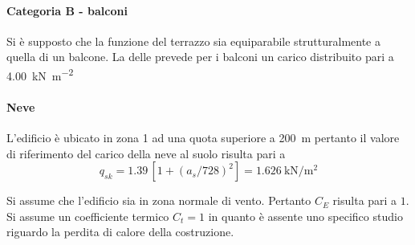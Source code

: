 \paragraph*{Categoria B - balconi} Si è supposto che la funzione del terrazzo sia equiparabile strutturalmente a quella di un balcone. 
La  delle  prevede per i balconi un carico distribuito pari a \SI{4.00}{\kilo\newton\per\square\meter}
\paragraph*{Neve}
L'edificio è ubicato in zona 1 ad una quota superiore a \SI{200}{\meter} pertanto il valore di riferimento del carico della neve al suolo risulta pari a
\[
	q_{sk}=1.39 \, [1+(a_s/728)^2] = \SI{1.626}{\kilo\newton\per\square\meter}
\]

Si assume che l'edificio sia in zona normale di vento. Pertanto $C_E$ risulta pari a $1$.
Si assume un coefficiente termico $C_t = 1$ in quanto è assente uno specifico studio riguardo la perdita di calore della costruzione. 

